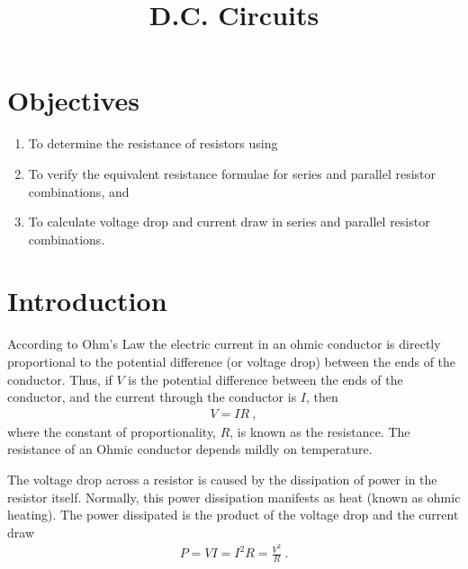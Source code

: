\documentclass[12pt]{article}
\title{D.C. Circuits}
\author{}
\date{}
\begin{document}
\maketitle

\section{Objectives}
\label{sec:objectives}

\begin{enumerate}
\item To determine the resistance of resistors using
\item To verify the equivalent resistance formulae for series and
  parallel resistor combinations, and
\item To calculate voltage drop and current draw in series and
  parallel resistor combinations.
\end{enumerate}

\section{Introduction}
\label{sec:introduction}

According to Ohm's Law the electric current in an ohmic conductor is
directly proportional to the potential difference (or voltage drop)
between the ends of the conductor.  Thus, if $V$ is the potential
difference between the ends of the conductor, and the current through
the conductor is $I$, then
\begin{gather*}
  V = IR\ ,
\end{gather*}
where the constant of proportionality, $R$, is known as the
resistance.  The resistance of an Ohmic conductor depends mildly on
temperature.

The voltage drop across a resistor is caused by the dissipation of
power in the resistor itself.  Normally, this power dissipation
manifests as heat (known as ohmic heating).  The power dissipated is
the product of the voltage drop and the current draw
\begin{gather*}
  P = VI = I^2 R = \frac{V^2}{R}\ .
\end{gather*}
\end{document}
